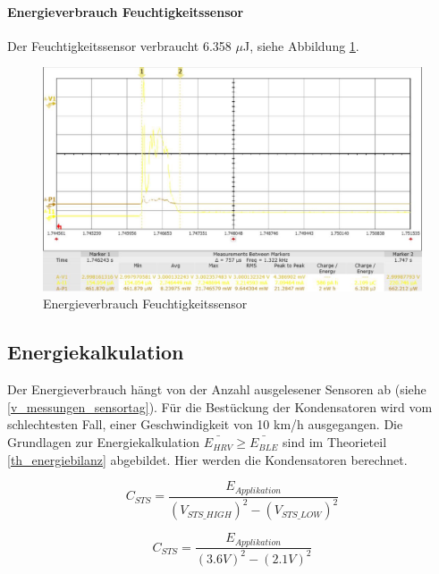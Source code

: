 \paragraph{Energieverbrauch Feuchtigkeitssensor}

Der Feuchtigkeitssensor verbraucht 6.358 $\mu$J, siehe Abbildung \ref{energie_humidity}.

\begin{figure}
  \includegraphics[width=1.0\textwidth]{3Vorgehen/imag/Humidity.png}
  \caption{Energieverbrauch Feuchtigkeitssensor}
  \label{energie_humidity}
\end{figure}




\subsection{Energiekalkulation}
\label{v_e_kalkulation}

Der Energieverbrauch hängt von der Anzahl ausgelesener Sensoren ab (siehe \ref{v_messungen_sensortag}). Für die Bestückung der Kondensatoren wird vom schlechtesten  Fall, einer Geschwindigkeit von 10 km/h ausgegangen. Die Grundlagen zur Energiekalkulation $\bar{E_{HRV}} \ge \bar{E_{BLE}} $ sind im Theorieteil \ref{th_energiebilanz} abgebildet. Hier werden die Kondensatoren berechnet.

\begin{equation}
  C_{STS}= \frac{ E_{Applikation}}{(V_{STS\_HIGH} )^2 - (V_{STS\_LOW} )^2}
\end{equation}

\begin{equation}
  C_{STS}= \frac{ E_{Applikation}}{(3.6 V )^2 - (2.1 V)^2}
\end{equation}

